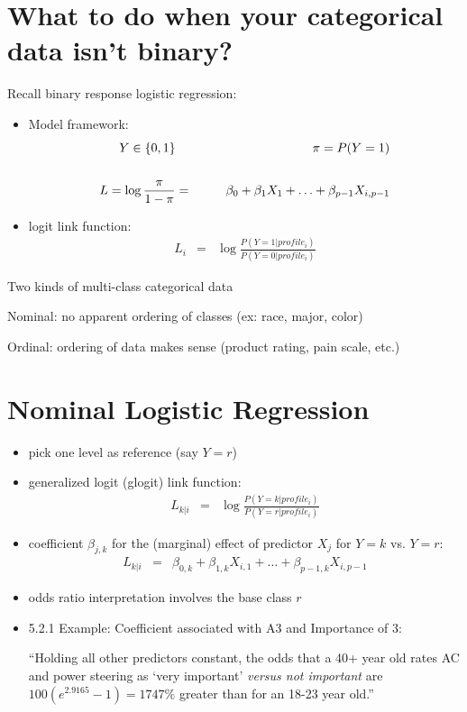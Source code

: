 \documentclass[12pt]{../notes}
\begin{document}

\section{What to do when your categorical data isn't binary?}

Recall binary response logistic regression:
\begin{itemize}
  \item Model framework:
    \begin{eqnarray}
      Y \in \{0 , 1\}  & \mbox{\hspace{3em}} &  \pi =  P(Y=1) \nonumber \\
      & \nonumber \\
      L = \log \frac{\pi}{1-\pi} & = & \beta_0 + \beta_1 X_1 + \ldots + \beta_{p-1} X_{i,p-1} \nonumber
    \end{eqnarray}
  \item logit link function:\\ \vspace{-1em}
\begin{eqnarray}
  L_i & = & \log \frac{P(Y = 1 | profile_i)}{ P(Y=0 | profile_i)} \nonumber
\end{eqnarray}
\end{itemize}

Two kinds of multi-class categorical data
\bi
\item Nominal: no apparent ordering of classes (ex: race, major, color) 
\item Ordinal: ordering of data makes sense (product rating, pain scale, etc.)
\ei

\section{Nominal Logistic Regression}
\begin{itemize}
  \item pick one level as reference (say $Y=r$)
  \item generalized logit (glogit) link function:
    \begin{eqnarray}
      L_{k|i} & = & \log \frac{P(Y = k | profile_i)}{ P(Y=r | profile_i)} \nonumber
    \end{eqnarray}
  \item coefficient $\beta_{j,k}$ for the (marginal) effect of predictor $X_j$ for $Y=k$ vs. $Y=r$:
      \begin{eqnarray}
        L_{k|i} & = & \beta_{0,k} + \beta_{1,k} X_{i,1} + \ldots + \beta_{p-1,k} X_{i,p-1} \nonumber
      \end{eqnarray}
  \item odds ratio interpretation involves the base class $r$
  \bi
  \item 5.2.1 Example: Coefficient associated with A3 and Importance of 3: 
  
  ``Holding all other predictors constant, the odds that a 40+ year old rates AC and power steering as `very important' \textit{versus not important} are $100(e^{2.9165} - 1) = 1747\%$ greater than for an 18-23 year old.''
  \ei
\end{itemize}
\end{document}
